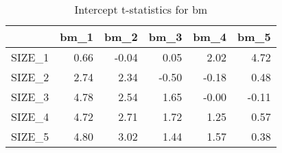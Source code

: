 \begin{table}[ht]
\centering
\caption{Intercept t-statistics for bm} 
\begin{tabular}{rrrrrr}
  \hline
 & bm\_1 & bm\_2 & bm\_3 & bm\_4 & bm\_5 \\ 
  \hline
SIZE\_1 & 0.66 & -0.04 & 0.05 & 2.02 & 4.72 \\ 
  SIZE\_2 & 2.74 & 2.34 & -0.50 & -0.18 & 0.48 \\ 
  SIZE\_3 & 4.78 & 2.54 & 1.65 & -0.00 & -0.11 \\ 
  SIZE\_4 & 4.72 & 2.71 & 1.72 & 1.25 & 0.57 \\ 
  SIZE\_5 & 4.80 & 3.02 & 1.44 & 1.57 & 0.38 \\ 
   \hline
\end{tabular}
\end{table}


